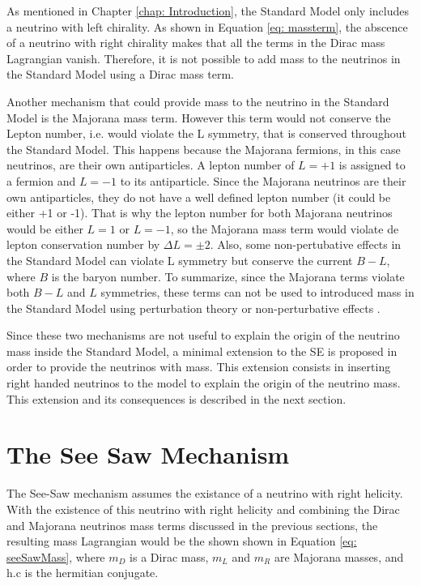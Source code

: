 As mentioned in Chapter \ref{chap: Introduction}, the Standard Model only includes a neutrino with left chirality. As shown in Equation \ref{eq: massterm}, the abscence of a neutrino with right chirality makes that all the terms in the Dirac mass Lagrangian vanish. Therefore, it is not possible to add mass to the neutrinos in the Standard Model using a Dirac mass term.

Another mechanism that could provide mass to the neutrino in the Standard Model is the Majorana mass term. However this term would not conserve the Lepton number, i.e. would violate the L symmetry, that is conserved throughout the Standard Model\cite{NeutrinoMass2}. This happens because the Majorana fermions, in this case neutrinos, are their own antiparticles. A lepton number of $L = +1$ is assigned to a fermion and $L = -1$ to its antiparticle. Since the Majorana neutrinos are their own antiparticles, they do not have a well defined lepton number (it could be either +1 or -1). That is why the lepton number for both Majorana neutrinos would be either $L = 1$ or $L = -1$, so the Majorana mass term would violate de lepton conservation number by $\Delta L = \pm 2$. Also, some non-pertubative effects in the Standard Model can violate L symmetry but conserve the current $B - L$, where $B$ is the baryon number. To summarize, since the Majorana terms violate both $B-L$ and $L$ symmetries, these terms can not be used to introduced mass in the Standard Model using perturbation theory or non-perturbative effects \cite{NeutrinoMass2}.  

Since these two mechanisms are not useful to explain the origin of the neutrino mass inside the Standard Model, a minimal extension to the SE is proposed in order to provide the neutrinos with mass. This extension consists in inserting right handed neutrinos to the model to explain the origin of the neutrino mass. This extension and its consequences is described in the next section.

\section{The See Saw Mechanism} 

The See-Saw mechanism assumes the existance of a neutrino with right helicity. With the existence of this neutrino with right helicity and combining the Dirac and Majorana neutrinos mass terms discussed in the previous sections, the resulting mass Lagrangian would be the shown shown in Equation \ref{eq: seeSawMass}, where $m_{D}$ is a Dirac mass, $m_{L}$ and $m_{R}$ are Majorana masses, and h.c is the hermitian conjugate.

